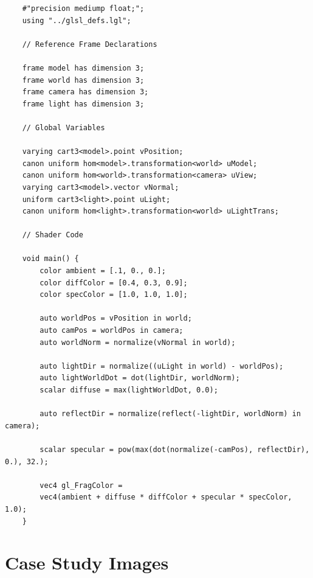 \begin{verbatim}
	#"precision mediump float;";
	using "../glsl_defs.lgl";
	
	// Reference Frame Declarations
	
	frame model has dimension 3;
	frame world has dimension 3;
	frame camera has dimension 3;
	frame light has dimension 3;
	
	// Global Variables
	
	varying cart3<model>.point vPosition;
	canon uniform hom<model>.transformation<world> uModel;
	canon uniform hom<world>.transformation<camera> uView;
	varying cart3<model>.vector vNormal;
	uniform cart3<light>.point uLight;
	canon uniform hom<light>.transformation<world> uLightTrans;
	
	// Shader Code
	
	void main() {
		color ambient = [.1, 0., 0.];
		color diffColor = [0.4, 0.3, 0.9];
		color specColor = [1.0, 1.0, 1.0];
		
		auto worldPos = vPosition in world;
		auto camPos = worldPos in camera;
		auto worldNorm = normalize(vNormal in world);
		
		auto lightDir = normalize((uLight in world) - worldPos);
		auto lightWorldDot = dot(lightDir, worldNorm);
		scalar diffuse = max(lightWorldDot, 0.0);
		
		auto reflectDir = normalize(reflect(-lightDir, worldNorm) in camera);
		
		scalar specular = pow(max(dot(normalize(-camPos), reflectDir), 0.), 32.);
		
		vec4 gl_FragColor = 
		vec4(ambient + diffuse * diffColor + specular * specColor, 1.0);
	}
\end{verbatim}

\section{Case Study Images}

